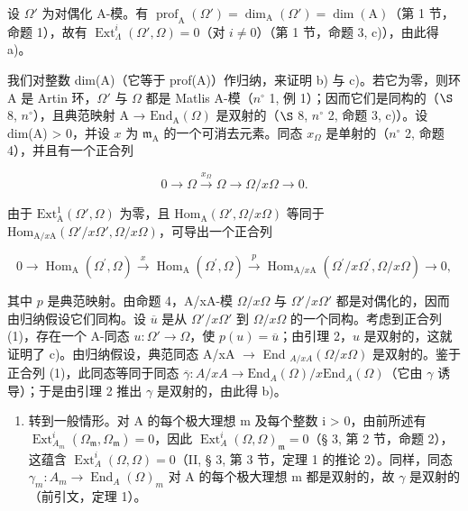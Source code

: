 设 \(\Omega'\) 为对偶化 A-模。有 \(\operatorname{prof}_{\mathrm{A}}(\Omega') = \dim_{\mathrm{A}}(\Omega') = \dim(\mathrm{A})\)（第 1 节，命题 1），故有 \(\operatorname{Ext}_{\Lambda}^{i}(\Omega', \Omega) = 0\)（对 \(i \neq 0\)）（第 1 节，命题 3, c)），由此得 a)。

我们对整数 dim(A)（它等于 prof(A)）作归纳，来证明 b) 与 c)。若它为零，则环 A 是 Artin 环，\(\Omega'\) 与 \(\Omega\) 都是 Matlis A-模（\(n^{\circ}\) 1, 例 1）；因而它们是同构的（\(\S\) 8, \(n^{\circ}\)），且典范映射 A → \(\mathrm{End}_{\mathrm{A}}(\Omega)\) 是双射的（\(\S\) 8, \(n^{\circ}\) 2, 命题 3, c)）。设 dim(A) \textgreater{} 0，并设 \(x\) 为 \(\mathfrak{m}_{\mathrm{A}}\) 的一个可消去元素。同态 \(x_{\Omega}\) 是单射的（\(n^{\circ}\) 2, 命题 4），并且有一个正合列

\[
0 \rightarrow \Omega \xrightarrow {x _ {\Omega}} \Omega \longrightarrow \Omega / x \Omega \rightarrow 0.
\]

由于 \(\mathrm{Ext}_{\mathrm{A}}^{1}(\Omega',\Omega)\) 为零，且 \(\mathrm{Hom}_{\mathrm{A}}(\Omega',\Omega /x\Omega)\) 等同于 \(\mathrm{Hom}_{\mathrm{A} / x\mathrm{A}}(\Omega'/x\Omega',\Omega/x\Omega)\)，可导出一个正合列

\[
0 \rightarrow \operatorname{Hom} _ {\mathrm{A}} \left(\Omega^ {\prime}, \Omega\right) \xrightarrow {x} \operatorname{Hom} _ {\mathrm{A}} \left(\Omega^ {\prime}, \Omega\right) \xrightarrow {p} \operatorname{Hom} _ {\mathrm{A} / x \mathrm{A}} \left(\Omega^ {\prime} / x \Omega^ {\prime}, \Omega / x \Omega\right)\rightarrow 0,\tag{1}
\]

其中 \(p\) 是典范映射。由命题 4，A/xA-模 \(\Omega/x\Omega\) 与 \(\Omega'/x\Omega'\) 都是对偶化的，因而由归纳假设它们同构。设 \(\overline{u}\) 是从 \(\Omega'/x\Omega'\) 到 \(\Omega/x\Omega\) 的一个同构。考虑到正合列 (1)，存在一个 A-同态 \(u: \Omega' \to \Omega\)，使 \(p(u) = \overline{u}\)；由引理 2，\(u\) 是双射的，这就证明了 c)。由归纳假设，典范同态 A/xA \(\longrightarrow\) End \(_{A/xA}(\Omega/x\Omega)\) 是双射的。鉴于正合列 (1)，此同态等同于同态 \(\overline{\gamma}: A/xA \longrightarrow \text{End}_A(\Omega)/x \text{End}_A(\Omega)\)（它由 \(\gamma\) 诱导）；于是由引理 2 推出 \(\gamma\) 是双射的，由此得 b)。

\begin{enumerate}
\def\labelenumi{\Alph{enumi})}
\setcounter{enumi}{1}
\tightlist
\item
  转到一般情形。对 A 的每个极大理想 m 及每个整数 i \textgreater{} 0，由前所述有 \(\operatorname{Ext}_{A_{m}}^{i}(\Omega_{\mathfrak{m}}, \Omega_{\mathfrak{m}}) = 0\)，因此 \(\operatorname{Ext}_{A}^{i}(\Omega, \Omega)_{\mathfrak{m}} = 0\)（§ 3, 第 2 节，命题 2），这蕴含 \(\operatorname{Ext}_{A}^{i}(\Omega, \Omega) = 0\)（II, § 3, 第 3 节，定理 1 的推论 2）。同样，同态 \(\gamma_{m}: A_{m} \to \operatorname{End}_{A}(\Omega)_{m}\) 对 A 的每个极大理想 m 都是双射的，故 \(\gamma\) 是双射的（前引文，定理 1）。
\end{enumerate}

